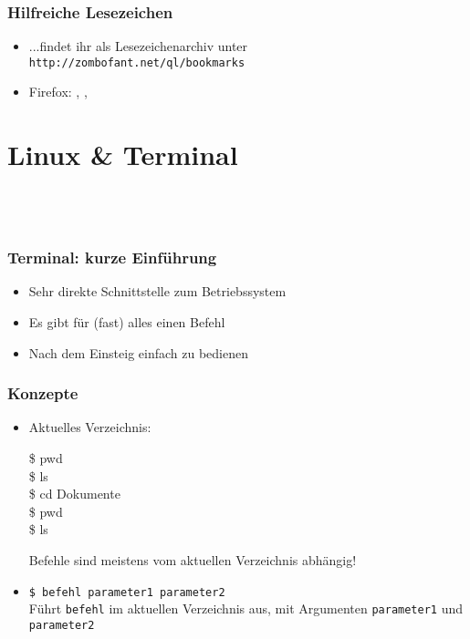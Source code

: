     \begin{frame}
        \frametitle{Hilfreiche Lesezeichen}
        \begin{itemize}
            \item ...findet ihr als Lesezeichenarchiv unter \\
                \texttt{http://zombofant.net/ql/bookmarks}
            \item Firefox: ,
                , 
        \end{itemize}
    \end{frame}

    \section{Linux \& Terminal}\subsection{~}

    \begin{frame}
        \frametitle{Terminal: kurze Einführung}
        \begin{itemize}
            \item Sehr direkte Schnittstelle zum Betriebssystem
            \item Es gibt für (fast) alles einen Befehl
            \item Nach dem Einsteig einfach zu bedienen
        \end{itemize}
    \end{frame}

    \begin{frame}
        \frametitle{Konzepte}
        \begin{itemize}
            \item Aktuelles Verzeichnis: \\
                \begin{tryit}
                    \$ pwd \\
                    \$ ls \\
                    \$ cd Dokumente \\
                    \$ pwd \\
                    \$ ls \\
                \end{tryit}
                \pause
                Befehle sind meistens vom aktuellen Verzeichnis abhängig!
            \pause
            \item \texttt{\$ befehl parameter1 parameter2} \\
                Führt \texttt{befehl} im aktuellen Verzeichnis aus, mit
                Argumenten \texttt{parameter1} und \texttt{parameter2}
        \end{itemize}
    \end{frame}

